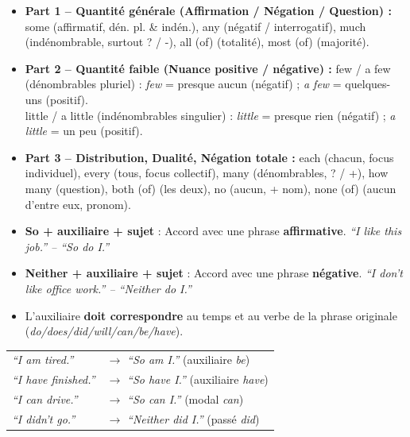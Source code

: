 \documentclass[11pt]{article}
\newcommand{\cle}[1]{{\popxbold\color{popdark}#1}}
\begin{document}
\begin{propriete}
\begin{itemize}
    \item \textbf{Part 1 -- Quantité générale (Affirmation / Négation / Question) :}
    \cle{some} (affirmatif, dén. pl. \& indén.), \cle{any} (négatif / interrogatif), \cle{much} (indénombrable, surtout ? / -), \cle{all (of)} (totalité), \cle{most (of)} (majorité).
    \item \textbf{Part 2 -- Quantité faible (Nuance positive / négative) :}
    \cle{few} / \cle{a few} (dénombrables pluriel) : \emph{few} = presque aucun (négatif) ; \emph{a few} = quelques-uns (positif). \\
    \cle{little} / \cle{a little} (indénombrables singulier) : \emph{little} = presque rien (négatif) ; \emph{a little} = un peu (positif).
    \item \textbf{Part 3 -- Distribution, Dualité, Négation totale :}
    \cle{each} (chacun, focus individuel), \cle{every} (tous, focus collectif), \cle{many} (dénombrables, ? / +), \cle{how many} (question), \cle{both (of)} (les deux), \cle{no} (aucun, + nom), \cle{none (of)} (aucun d'entre eux, pronom).
\end{itemize}
\end{propriete}

\begin{definition}
\begin{itemize}
    \item \textbf{So + auxiliaire + sujet} : Accord avec une phrase \textbf{affirmative}. \emph{``I like this job.'' -- ``So do I.''}
    \item \textbf{Neither + auxiliaire + sujet} : Accord avec une phrase \textbf{négative}. \emph{``I don't like office work.'' -- ``Neither do I.''}
    \item L'auxiliaire \textbf{doit correspondre} au temps et au verbe de la phrase originale (\emph{do/does/did/will/can/be/have}).
\end{itemize}
\end{definition}

\begin{exemplebox}
\begin{tabular}{ll}
\emph{``I am tired.''} & $\rightarrow$ \emph{``So am I.''} (auxiliaire \emph{be}) \\
\emph{``I have finished.''} & $\rightarrow$ \emph{``So have I.''} (auxiliaire \emph{have}) \\
\emph{``I can drive.''} & $\rightarrow$ \emph{``So can I.''} (modal \emph{can}) \\
\emph{``I didn't go.''} & $\rightarrow$ \emph{``Neither did I.''} (passé \emph{did}) \\
\end{tabular}
\end{exemplebox}
\end{document}
